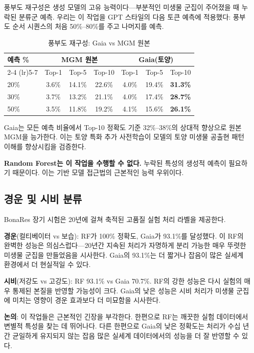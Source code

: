 \documentclass[11pt,a4paper]{article}
\begin{document}
풍부도 재구성은 생성 모델의 고유 능력이다---부분적인 미생물 군집이 주어졌을 때 누락된 분류군 예측. 우리는 이 작업을 GPT 스타일의 다음 토큰 예측에 적용했다: 풍부도 순서 시퀀스의 처음 50\%--80\%를 주고 나머지를 예측.

\begin{table}[H]
\centering
\caption{풍부도 재구성: Gaia vs MGM 원본}
\label{tab:reconstruction}
\begin{tabular}{lcccccc}
\toprule
\multirow{2}{*}{\textbf{예측 \%}} & \multicolumn{3}{c}{\textbf{MGM 원본}} & \multicolumn{3}{c}{\textbf{Gaia(토양)}} \\
\cmidrule(lr){2-4} \cmidrule(lr){5-7}
 & Top-1 & Top-5 & Top-10 & Top-1 & Top-5 & Top-10 \\
\midrule
20\% & 3.6\% & 14.1\% & 22.6\% & 4.0\% & 19.4\% & \textbf{31.3\%} \\
30\% & 3.7\% & 13.2\% & 21.1\% & 4.0\% & 17.4\% & \textbf{28.7\%} \\
50\% & 3.5\% & 11.8\% & 19.2\% & 4.1\% & 15.6\% & \textbf{26.1\%} \\
\bottomrule
\end{tabular}
\end{table}

Gaia는 모든 예측 비율에서 Top-10 정확도 기준 32\%--38\%의 상대적 향상으로 원본 MGM을 능가한다. 이는 토양 특화 추가 사전학습이 모델의 토양 미생물 공출현 패턴 이해를 향상시킴을 검증한다.

\textbf{Random Forest는 이 작업을 수행할 수 없다.} 누락된 특성의 생성적 예측이 필요하기 때문이다. 이는 기반 모델 접근법의 근본적인 능력 우위이다.

\subsection{경운 및 시비 분류}

BonaRes 장기 시험은 20년에 걸쳐 축적된 고품질 실험 처리 라벨을 제공한다.

\textbf{경운}(컬티베이터 vs 보습): RF가 100\% 정확도, Gaia가 93.1\%를 달성했다. 이 RF의 완벽한 성능은 의심스럽다---20년간 지속된 처리가 자명하게 분리 가능한 매우 뚜렷한 미생물 군집을 만들었음을 시사한다. Gaia의 93.1\%는 더 짧거나 잡음이 많은 실세계 환경에서 더 현실적일 수 있다.

\textbf{시비}(저강도 vs 고강도): RF 93.1\% vs Gaia 70.7\%. RF의 강한 성능은 다시 실험의 매우 통제된 본질을 반영할 가능성이 크다. Gaia의 낮은 성능은 시비 처리가 미생물 군집에 미치는 영향이 경운 효과보다 더 미묘함을 시사한다.

\textbf{논의}: 이 작업들은 근본적인 긴장을 부각한다. 한편으로 RF는 깨끗한 실험 데이터에서 변별적 특성을 찾는 데 뛰어나다. 다른 한편으로 Gaia의 낮은 정확도는 처리가 수십 년간 균일하게 유지되지 않는 잡음 많은 실세계 데이터에서의 성능을 더 잘 반영할 수 있다.
\end{document}
